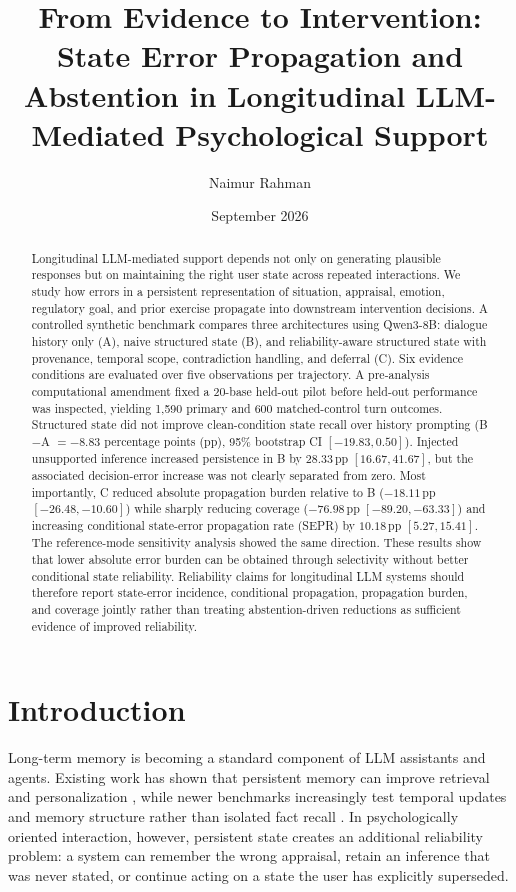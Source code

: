 \documentclass[10pt]{article}
\title{From Evidence to Intervention: State Error Propagation and Abstention in Longitudinal LLM-Mediated Psychological Support}
\author{Naimur Rahman}
\affil{Independent Researcher, London, United Kingdom\\ORCID: 0009-0004-2794-077X}
\date{September 2026}
\newcommand{\pp}{\,\mathrm{pp}}
\begin{document}
\maketitle

\begin{abstract}
Longitudinal LLM-mediated support depends not only on generating plausible responses but on maintaining the right user state across repeated interactions. We study how errors in a persistent representation of situation, appraisal, emotion, regulatory goal, and prior exercise propagate into downstream intervention decisions. A controlled synthetic benchmark compares three architectures using Qwen3-8B: dialogue history only (A), naive structured state (B), and reliability-aware structured state with provenance, temporal scope, contradiction handling, and deferral (C). Six evidence conditions are evaluated over five observations per trajectory. A pre-analysis computational amendment fixed a 20-base held-out pilot before held-out performance was inspected, yielding 1,590 primary and 600 matched-control turn outcomes. Structured state did not improve clean-condition state recall over history prompting (B$-$A $=-8.83$ percentage points (pp), 95\% bootstrap CI $[-19.83,0.50]$). Injected unsupported inference increased persistence in B by $28.33\pp$ $[16.67,41.67]$, but the associated decision-error increase was not clearly separated from zero. Most importantly, C reduced absolute propagation burden relative to B ($-18.11\pp$ $[-26.48,-10.60]$) while sharply reducing coverage ($-76.98\pp$ $[-89.20,-63.33]$) and increasing conditional state-error propagation rate (SEPR) by $10.18\pp$ $[5.27,15.41]$. The reference-mode sensitivity analysis showed the same direction. These results show that lower absolute error burden can be obtained through selectivity without better conditional state reliability. Reliability claims for longitudinal LLM systems should therefore report state-error incidence, conditional propagation, propagation burden, and coverage jointly rather than treating abstention-driven reductions as sufficient evidence of improved reliability.
\end{abstract}

\section{Introduction}
Long-term memory is becoming a standard component of LLM assistants and agents. Existing work has shown that persistent memory can improve retrieval and personalization \cite{zhong2024memorybank,wu2024longmemeval}, while newer benchmarks increasingly test temporal updates and memory structure rather than isolated fact recall \cite{shutova2026structmemeval}. In psychologically oriented interaction, however, persistent state creates an additional reliability problem: a system can remember the wrong appraisal, retain an inference that was never stated, or continue acting on a state the user has explicitly superseded.
\end{document}
